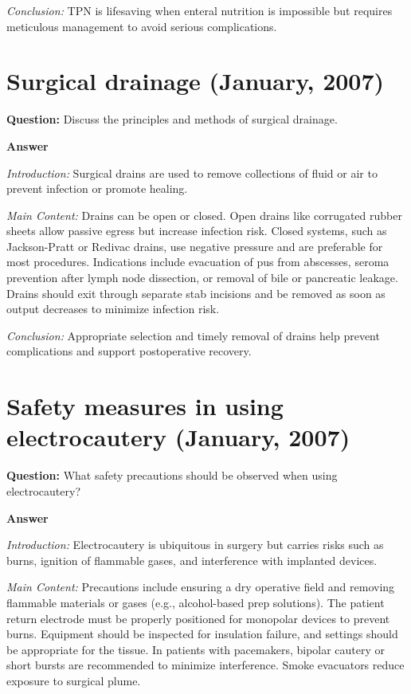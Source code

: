 \documentclass{article}
\begin{document}
\emph{Conclusion:} TPN is lifesaving when enteral nutrition is impossible but requires meticulous management to avoid serious complications.


\section{Surgical drainage (January, 2007)}


\textbf{Question:} Discuss the principles and methods of surgical drainage.

\textbf{Answer}

\emph{Introduction:} Surgical drains are used to remove collections of fluid or air to prevent infection or promote healing.

\emph{Main Content:} Drains can be open or closed. Open drains like corrugated rubber sheets allow passive egress but increase infection risk. Closed systems, such as Jackson-Pratt or Redivac drains, use negative pressure and are preferable for most procedures. Indications include evacuation of pus from abscesses, seroma prevention after lymph node dissection, or removal of bile or pancreatic leakage. Drains should exit through separate stab incisions and be removed as soon as output decreases to minimize infection risk.

\emph{Conclusion:} Appropriate selection and timely removal of drains help prevent complications and support postoperative recovery.


\section{Safety measures in using electrocautery (January, 2007)}


\textbf{Question:} What safety precautions should be observed when using electrocautery?

\textbf{Answer}

\emph{Introduction:} Electrocautery is ubiquitous in surgery but carries risks such as burns, ignition of flammable gases, and interference with implanted devices.

\emph{Main Content:} Precautions include ensuring a dry operative field and removing flammable materials or gases (e.g., alcohol-based prep solutions). The patient return electrode must be properly positioned for monopolar devices to prevent burns. Equipment should be inspected for insulation failure, and settings should be appropriate for the tissue. In patients with pacemakers, bipolar cautery or short bursts are recommended to minimize interference. Smoke evacuators reduce exposure to surgical plume.
\end{document}
